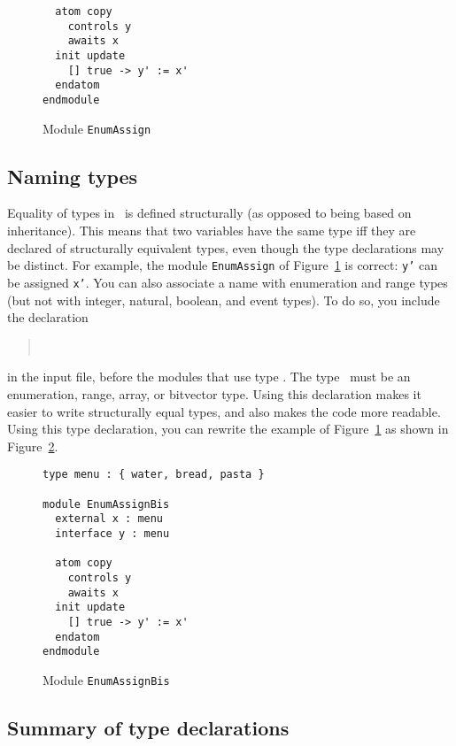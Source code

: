 {\begin{figure}
\begin{verbatim}
  atom copy 
    controls y
    awaits x
  init update 
    [] true -> y' := x'
  endatom
endmodule 
\end{verbatim}
\caption{Module {\tt EnumAssign}}
\label{fig-enumassign}
\end{figure}

\subsection{Naming types}

Equality of types in \mocha\ is defined structurally (as opposed to
being based on inheritance).  This means that two variables have the
same type iff they are declared of structurally equivalent types, even
though the type declarations may be distinct.  For example, the module
{\tt EnumAssign} of Figure~\ref{fig-enumassign} is correct: {\tt y'}
can be assigned {\tt x'}.  You can
also associate a name with enumeration and range
types (but not with integer, natural, boolean, and
event types).  To do so, you include the declaration
%
\begin{quote}
\TYPEDEF\ \typename\ \COLON\ \complextype{}
\end{quote}
%
in the input file, before the modules that use type \typename.  The
type \complextype\ must be an enumeration, range, array, or bitvector
type.  Using this declaration makes it easier to write structurally
equal types, and also makes the code more readable.  Using this type
declaration, you can rewrite the example of
Figure~\ref{fig-enumassign} as shown in
Figure~\ref{fig-enumassignbis}. 

\begin{figure}
\begin{verbatim}
type menu : { water, bread, pasta } 

module EnumAssignBis
  external x : menu
  interface y : menu

  atom copy 
    controls y
    awaits x
  init update 
    [] true -> y' := x'
  endatom
endmodule 
\end{verbatim}
\caption{Module {\tt EnumAssignBis}}
\label{fig-enumassignbis}
\end{figure}





\subsection{Summary of type declarations}
\label{sec-summary-type}

}
